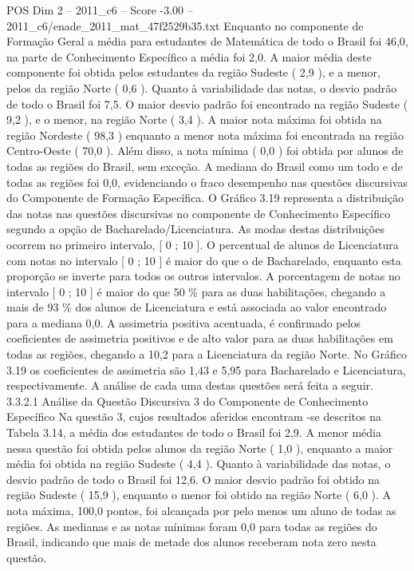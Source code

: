 \begin{textsample}{POS Dim 2 – 2011\_c6 – Score -3.00 – 2011\_c6/enade\_2011\_mat\_47f2529b35.txt}
Enquanto no componente de Formação Geral a média para estudantes de Matemática de todo o Brasil foi 46,0, na parte de Conhecimento Específico a média foi 2,0.
A maior média deste componente foi obtida pelos estudantes da região Sudeste ( 2,9 ), e a menor, pelos da região Norte ( 0,6 ).
Quanto à variabilidade das notas, o desvio padrão de todo o Brasil foi 7,5.
O maior desvio padrão foi encontrado na região Sudeste ( 9,2 ), e o menor, na região Norte ( 3,4 ).
A maior nota máxima foi obtida na região Nordeste ( 98,3 ) enquanto a menor nota máxima foi encontrada na região Centro-Oeste ( 70,0 ).
Além disso, a nota mínima ( 0,0 ) foi obtida por alunos de todas as regiões do Brasil, sem exceção.
A mediana do Brasil como um todo e de todas as regiões foi 0,0, evidenciando o fraco desempenho nas questões discursivas do Componente de Formação Específica.
O Gráfico 3.19 representa a distribuição das notas nas questões discursivas no componente de Conhecimento Específico segundo a opção de Bacharelado/Licenciatura.
As modas destas distribuições ocorrem no primeiro intervalo, [ 0 ; 10 ].
O percentual de alunos de Licenciatura com notas no intervalo [ 0 ; 10 ] é maior do que o de Bacharelado, enquanto esta proporção se inverte para todos os outros intervalos.
A porcentagem de notas no intervalo [ 0 ; 10 ] é maior do que 50 \% para as duas habilitações, chegando a mais de 93 \% dos alunos de Licenciatura e está associada ao valor encontrado para a mediana 0,0.
A assimetria positiva acentuada, é confirmado pelos coeficientes de assimetria positivos e de alto valor para as duas habilitações em todas as regiões, chegando a 10,2 para a Licenciatura da região Norte.
No Gráfico 3.19 os coeficientes de assimetria são 1,43 e 5,95 para Bacharelado e Licenciatura, respectivamente.
A análise de cada uma destas questões será feita a seguir. 3.3.2.1 Análise da Questão Discursiva 3 do Componente de Conhecimento Específico Na questão 3, cujos resultados aferidos encontram -se descritos na Tabela 3.14, a média dos estudantes de todo o Brasil foi 2,9.
A menor média nessa questão foi obtida pelos alunos da região Norte ( 1,0 ), enquanto a maior média foi obtida na região Sudeste ( 4,4 ).
Quanto à variabilidade das notas, o desvio padrão de todo o Brasil foi 12,6.
O maior desvio padrão foi obtido na região Sudeste ( 15,9 ), enquanto o menor foi obtido na região Norte ( 6,0 ).
A nota máxima, 100,0 pontos, foi alcançada por pelo menos um aluno de todas as regiões.
As medianas e as notas mínimas foram 0,0 para todas as regiões do Brasil, indicando que mais de metade dos alunos receberam nota zero nesta questão.

\end{textsample}
